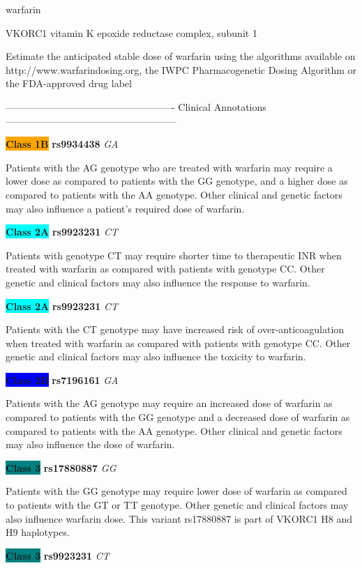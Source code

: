 \documentclass{resume} %
\begin{document}
\begin{rSection}{ warfarin }
\begin{rSubsection}{ VKORC1 }{ vitamin K epoxide reductase complex, subunit 1 }{}{}
\item[] Estimate the anticipated stable dose of warfarin using the algorithms available on http://www.warfarindosing.org, the IWPC Pharmacogenetic Dosing Algorithm or the FDA-approved drug label
\item[] ---------------------------------------------------- Clinical Annotations -----------------------------------------------------\newline
\item \textbf{\colorbox{orange} {Class 1B}} \textbf{ rs9934438 } \textit{ GA }
\item[] Patients with the AG genotype who are treated with warfarin may require a lower dose as compared to patients with the GG genotype, and a higher dose as compared to patients with the AA genotype. Other clinical and genetic factors may also influence a patient’s required dose of warfarin. \item \textbf{\colorbox{cyan} {Class 2A}} \textbf{ rs9923231 } \textit{ CT }
\item[] Patients with genotype CT may require shorter time to therapeutic INR when treated with warfarin as compared with patients with genotype CC. Other genetic and clinical factors may also influence the response to warfarin. \item \textbf{\colorbox{cyan} {Class 2A}} \textbf{ rs9923231 } \textit{ CT }
\item[] Patients with the CT genotype may have increased risk of over-anticoagulation when treated with warfarin as compared with patients with genotype CC. Other genetic and clinical factors may also influence the toxicity to warfarin.\item \textbf{\colorbox{blue} {Class 2B}} \textbf{ rs7196161 } \textit{ GA }
\item[] Patients with the AG genotype may require an increased dose of warfarin as compared to patients with the GG genotype and a decreased dose of warfarin as compared to patients with the AA genotype. Other clinical and genetic factors may also influence the dose of warfarin. \item \textbf{\colorbox{teal} {Class 3}} \textbf{ rs17880887 } \textit{ GG }
\item[] Patients with the GG genotype may require lower dose of warfarin as compared to patients with the GT or TT genotype. Other genetic and clinical factors may also influence warfarin dose. This variant rs17880887 is part of VKORC1 H8 and H9 haplotypes.\item \textbf{\colorbox{teal} {Class 3}} \textbf{ rs9923231 } \textit{ CT }

\end{rSubsection}
\end{rSection}
\end{document}
